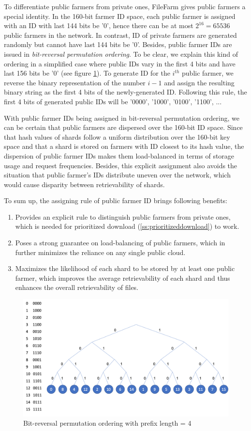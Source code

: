 To differentiate public farmers from private ones, FileFarm gives public farmers a special identity. In the 160-bit farmer ID space, each public farmer is assigned with an ID with last 144 bits be '0', hence there can be at most $2^{16}=65536$ public farmers in the network. In contrast, ID of private farmers are generated randomly but cannot have last 144 bits be '0'. Besides, public farmer IDs are issued in \textit{bit-reversal permutation ordering}. To be clear, we explain this kind of ordering in a simplified case where public IDs vary in the first 4 bits and have last 156 bits be '0' (see figure \ref{fig:bitreversalpermutationordering}). To generate ID for the $i^{th}$ public farmer, we reverse the binary representation of the number $i-1$ and assign the resulting binary string as the first 4 bits of the newly-generated ID. Following this rule, the first 4 bits of generated public IDs will be '0000', '1000', '0100', '1100', ...

With public farmer IDs being assigned in bit-reversal permutation ordering, we can be certain that public farmers are dispersed over the 160-bit ID space. Since that hash values of shards follow a uniform distribution over the 160-bit key space and that a shard is stored on farmers with ID closest to its hash value, the dispersion of public farmer IDs makes them load-balanced in terms of storage usage and request frequencies. Besides, this explicit assignment also avoids the situation that public farmer's IDs distribute uneven over the network, which would cause disparity between retrievability of shards.

To sum up, the assigning rule of public farmer ID brings following benefits:

\begin{enumerate}
  \item Provides an explicit rule to distinguish public farmers from private ones, which is needed for prioritized download (\ref{ss:prioritizeddownload}) to work.
  \item Poses a strong guarantee on load-balancing of public farmers, which in further minimizes the reliance on any single public cloud.
  \item Maximizes the likelihood of each shard to be stored by at least one public farmer, which improves the average retrievability of each shard and thus enhances the overall retrievability of files.
\end{enumerate}

\begin{figure}[!b]
\centering
  \includegraphics[width=15cm]{figures/bit_reversal_permutation_ordering.png}
  \caption{Bit-reversal permutation ordering with prefix length = 4}
  \label{fig:bitreversalpermutationordering}
\end{figure}